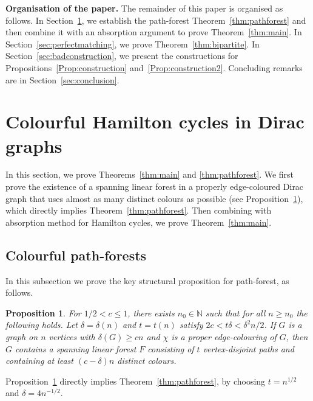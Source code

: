 \documentclass[11pt,reqno]{amsart}
\newtheorem{proposition}[theorem]{Proposition}
\theoremstyle{definition}
\theoremstyle{remark}
\renewcommand\le{\leqslant}
\renewcommand\ge{\geqslant}
\begin{document}
\noindent\textbf{Organisation of the paper.} The remainder of this paper is organised as follows.
In Section~\ref{sec:Hamiltoncycle}, we establish the path-forest Theorem~\ref{thm:pathforest} and then combine it with an absorption argument to prove Theorem~\ref{thm:main}.
In Section~\ref{sec:perfectmatching}, we prove Theorem~\ref{thm:bipartite}.
In Section~\ref{sec:badconstruction}, we present the constructions for Propositions~\ref{Prop:construction} and~\ref{Prop:construction2}.
Concluding remarks are in Section~\ref{sec:conclusion}.


\medskip


\section{Colourful Hamilton cycles in Dirac graphs}\label{sec:Hamiltoncycle}

In this section, we prove Theorems~\ref{thm:main} and \ref{thm:pathforest}. We first prove the existence of a spanning linear forest in a properly edge-coloured Dirac graph that uses almost as many distinct colours as possible (see Proposition~\ref{prop:pathforest}), which directly implies
Theorem~\ref{thm:pathforest}. Then combining with absorption method for Hamilton cycles, we prove Theorem~\ref{thm:main}.


\subsection{Colourful path-forests}
In this subsection we prove the key structural proposition for path-forest, as follows.

\begin{proposition}\label{prop:pathforest}
For $1/2<c\le 1$, there exists $n_0\in\mathbb N$ such that for all $n\ge n_0$ the following holds. Let $\delta=\delta(n)$ and $t=t(n)$ satisfy $2c<t\delta<\delta^2 n/2$. If $G$ is a graph on $n$ vertices with $\delta(G)\ge cn$ and $\chi$ is a proper edge-colouring of $G$, then $G$ contains a spanning linear forest $F$ consisting of $t$ vertex-disjoint paths and containing at least $(c-\delta)n$ distinct colours.
\end{proposition}

Proposition~\ref{prop:pathforest} directly implies Theorem~\ref{thm:pathforest}, by choosing $t=n^{1/2}$ and $\delta=4n^{-1/2}$.
\end{document}
